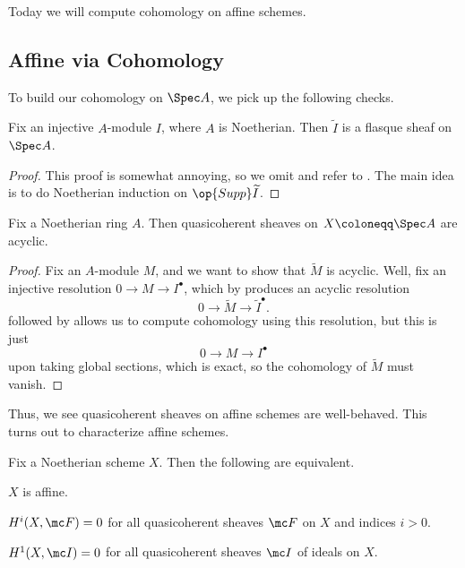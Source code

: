 \documentclass[../notes.tex]{subfiles}
\begin{document}
Today we will compute cohomology on affine schemes.

\subsection{Affine via Cohomology}
To build our cohomology on $\Spec A$, we pick up the following checks.
\begin{proposition} \label{prop:inj-to-flasque-qcho}
	Fix an injective $A$-module $I$, where $A$ is Noetherian. Then $\widetilde I$ is a flasque sheaf on $\Spec A$.
\end{proposition}
\begin{proof}
	This proof is somewhat annoying, so we omit and refer to \cite[Proposition~III.3.4]{hartshorne}. The main idea is to do Noetherian induction on $\op{Supp}\widetilde I$.
\end{proof}
\begin{proposition} \label{prop:qchoh-affine-acyclic}
	Fix a Noetherian ring $A$. Then quasicoherent sheaves on $X\coloneqq\Spec A$ are acyclic.
\end{proposition}
\begin{proof}
	Fix an $A$-module $M$, and we want to show that $\widetilde M$ is acyclic. Well, fix an injective resolution $0\to M\to I^\bullet$, which by  produces an acyclic resolution
	\[0\to\widetilde M\to\widetilde I^\bullet.\]
	 followed by  allows us to compute cohomology using this resolution, but this is just
	\[0\to M\to I^\bullet\]
	upon taking global sections, which is exact, so the cohomology of $\widetilde M$ must vanish.
\end{proof}
Thus, we see quasicoherent sheaves on affine schemes are well-behaved. This turns out to characterize affine schemes.
\begin{theorem}[Serre]
	Fix a Noetherian scheme $X$. Then the following are equivalent.
	\begin{listroman}
		\item $X$ is affine.
		\item $H^i(X,\mc F)=0$ for all quasicoherent sheaves $\mc F$ on $X$ and indices $i>0$.
		\item $H^1(X,\mc I)=0$ for all quasicoherent sheaves $\mc I$ of ideals on $X$.
	\end{listroman}
\end{theorem}
\end{document}
